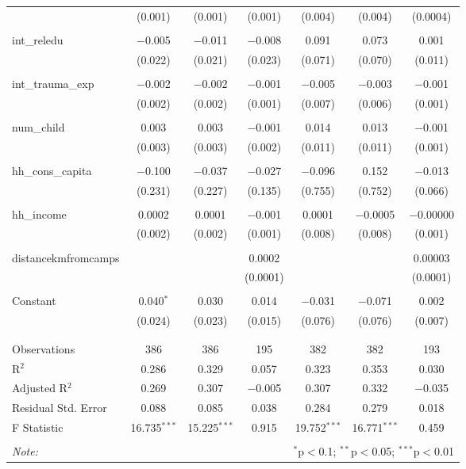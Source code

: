 \begin{table}[H]
\begin{tabular}{@{\extracolsep{4pt}}lcccccc}
  & (0.001) & (0.001) & (0.001) & (0.004) & (0.004) & (0.0004) \\ 
  & & & & & & \\ 
 int\_reledu & $-$0.005 & $-$0.011 & $-$0.008 & 0.091 & 0.073 & 0.001 \\ 
  & (0.022) & (0.021) & (0.023) & (0.071) & (0.070) & (0.011) \\ 
  & & & & & & \\ 
 int\_trauma\_exp & $-$0.002 & $-$0.002 & $-$0.001 & $-$0.005 & $-$0.003 & $-$0.001 \\ 
  & (0.002) & (0.002) & (0.001) & (0.007) & (0.006) & (0.001) \\ 
  & & & & & & \\ 
 num\_child & 0.003 & 0.003 & $-$0.001 & 0.014 & 0.013 & $-$0.001 \\ 
  & (0.003) & (0.003) & (0.002) & (0.011) & (0.011) & (0.001) \\ 
  & & & & & & \\ 
 hh\_cons\_capita & $-$0.100 & $-$0.037 & $-$0.027 & $-$0.096 & 0.152 & $-$0.013 \\ 
  & (0.231) & (0.227) & (0.135) & (0.755) & (0.752) & (0.066) \\ 
  & & & & & & \\ 
 hh\_income & 0.0002 & 0.0001 & $-$0.001 & 0.0001 & $-$0.0005 & $-$0.00000 \\ 
  & (0.002) & (0.002) & (0.001) & (0.008) & (0.008) & (0.001) \\ 
  & & & & & & \\ 
 distancekmfromcamps &  &  & 0.0002 &  &  & 0.00003 \\ 
  &  &  & (0.0001) &  &  & (0.0001) \\ 
  & & & & & & \\ 
 Constant & 0.040$^{*}$ & 0.030 & 0.014 & $-$0.031 & $-$0.071 & 0.002 \\ 
  & (0.024) & (0.023) & (0.015) & (0.076) & (0.076) & (0.007) \\ 
  & & & & & & \\ 
\hline \\[-1.8ex] 
Observations & 386 & 386 & 195 & 382 & 382 & 193 \\ 
R$^{2}$ & 0.286 & 0.329 & 0.057 & 0.323 & 0.353 & 0.030 \\ 
Adjusted R$^{2}$ & 0.269 & 0.307 & $-$0.005 & 0.307 & 0.332 & $-$0.035 \\ 
Residual Std. Error & 0.088 & 0.085 & 0.038 & 0.284 & 0.279 & 0.018 \\ 
F Statistic & 16.735$^{***}$ & 15.225$^{***}$ & 0.915 & 19.752$^{***}$ & 16.771$^{***}$ & 0.459 \\ 
\hline 
\hline \\[-1.8ex] 
\textit{Note:}  & \multicolumn{6}{r}{$^{*}$p$<$0.1; $^{**}$p$<$0.05; $^{***}$p$<$0.01} \\ 
\end{tabular} 
\end{table} 
